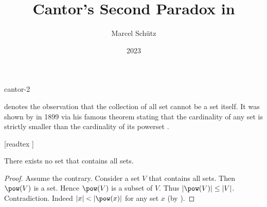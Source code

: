 \documentclass{stex}
\begin{document}
\title{Cantor's Second Paradox in \Naproche}
\author{Marcel Schütz}
\date{2023}
\maketitle
\begin{smodule}{cantor-2}
\begin{sparagraph}
  \noindent \emph{} denotes the observation that the collection of all set cannot be a set itself.
  It was shown by  in 1899 via his famous theorem stating that the cardinality of any set is strictly smaller than the cardinality of its powerset \cite[chapter 163]{Cantor1991}.
\end{sparagraph}

\begin{forthel}
  [readtex ]

  \begin{theorem*}\label{cantor_paradox_2}
    There exists no set that contains all sets.
  \end{theorem*}
  \begin{proof}
    Assume the contrary.
    Consider a set $V$ that contains all sets.
    Then $\pow(V)$ is a set.
    Hence $\pow(V)$ is a subset of $V$.
    Thus $|\pow(V)| \leq |V|$.
    Contradiction.
    Indeed $|x| < |\pow(x)|$ for any set $x$ (by ).
  \end{proof}
\end{forthel}
\end{smodule}
\printbibliography
\end{document}
